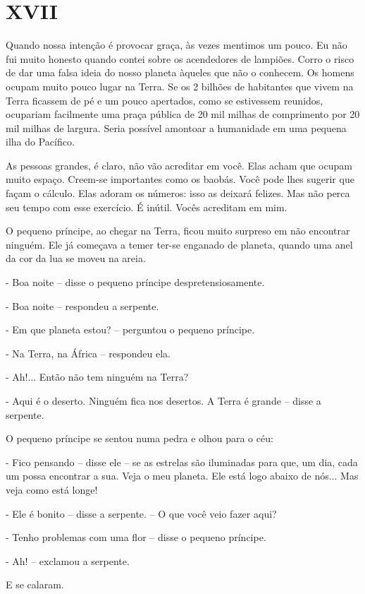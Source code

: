 \chapter{XVII}

Quando nossa intenção é provocar graça, às vezes mentimos um pouco. Eu
não fui muito honesto quando contei sobre os acendedores de lampiões.
Corro o risco de dar uma falsa ideia do nosso planeta àqueles que não o
conhecem. Os homens ocupam muito pouco lugar na Terra. Se os 2 bilhões
de habitantes que vivem na Terra ficassem de pé e um pouco apertados,
como se estivessem reunidos, ocupariam facilmente uma praça pública de
20 mil milhas de comprimento por 20 mil milhas de largura. Seria
possível amontoar a humanidade em uma pequena ilha do Pacífico.

As pessoas grandes, é claro, não vão acreditar em você. Elas acham que
ocupam muito espaço. Creem-se importantes como os baobás. Você pode lhes
sugerir que façam o cálculo. Elas adoram os números: isso as deixará
felizes. Mas não perca seu tempo com esse exercício. É inútil. Vocês
acreditam em mim.

O pequeno príncipe, ao chegar na Terra, ficou muito surpreso em não
encontrar ninguém. Ele já começava a temer ter-se enganado de planeta,
quando uma anel da cor da lua se moveu na areia.

- Boa noite -- disse o pequeno príncipe despretensiosamente.

- Boa noite -- respondeu a serpente.

- Em que planeta estou? -- perguntou o pequeno príncipe.

- Na Terra, na África -- respondeu ela.

- Ah!... Então não tem ninguém na Terra?

- Aqui é o deserto. Ninguém fica nos desertos. A Terra é grande -- disse
a serpente.

O pequeno príncipe se sentou numa pedra e olhou para o céu:

- Fico pensando -- disse ele -- se as estrelas são iluminadas para que,
um dia, cada um possa encontrar a sua. Veja o meu planeta. Ele está logo
abaixo de nós... Mas veja como está longe!

- Ele é bonito -- disse a serpente. -- O que você veio fazer aqui?

- Tenho problemas com uma flor -- disse o pequeno príncipe.

- Ah! -- exclamou a serpente.

E se calaram.

